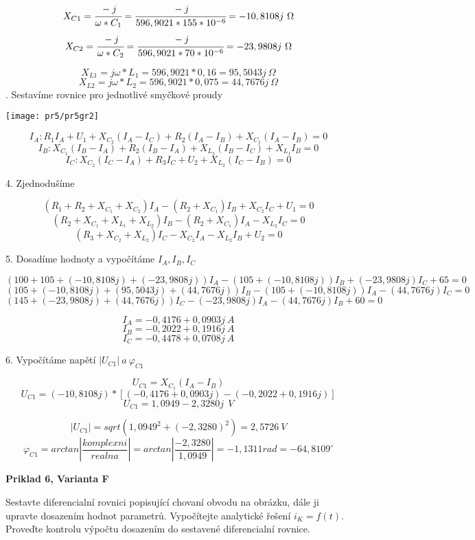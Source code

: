\documentclass[a4paper,12pt]{article}
\begin{document}
$$
 X_{C1} = \cfrac{-j}{\omega * C_1} = \cfrac{-j}{596,9021 * 155 * 10^{-6}} = -10,8108j\ \Omega 
$$
$$
 X_{C2} = \cfrac{-j}{\omega * C_2} = \cfrac{-j}{596,9021 * 70 * 10^{-6}} = -23,9808j\ \Omega
$$

$$
X_{L1} = j\omega * L_1 = 596,9021 * 0,16  = 95,5043j\ \Omega 
$$
$$
X_{L2} = j\omega * L_2 = 596,9021 * 0,075  = 44,7676j\ \Omega
$$
. Sestavíme rovnice pro jednotlivé smyčkové proudy

\begin{center}
\texttt{[image: pr5/pr5gr2]}
\end{center}

$$I_{A}: R_{1}I_{A} + U_{1} + X_{C_{2}}(I_{A}-I_{C}) + R_{2}(I_{A}-I_{B})+X_{C_{1}}(I_{A}-I_{B})=0$$
$$I_{B}: X_{C_{1}}(I_{B}-I_{A}) + R_{2}(I_{B}-I_{A}) + X_{L_{2}}(I_{B}-I_{C}) + X_{L_{1}}I_{B}=0$$
$$I_{C}: X_{C_{2}}(I_{C}-I_{A}) + R_{3}I_{C} + U_{2} + X_{L_{2}}(I_{C}-I_{B})=0$$

4. Zjednodušíme

$$(R_{1}+R_{2}+X_{C_{1}}+X_{C_{2}})I_{A} - (R_{2}+X_{C_{1}})I_{B} + X_{C_{2}}I_{C} + U_{1}=0$$
$$(R_{2}+X_{C_{1}}+X_{L_{1}}+X_{L_{2}})I_{B} - (R_{2}+X_{C_{1}})I_{A} - X_{L_{2}}I_{C}=0$$
$$(R_{3}+X_{C_{2}}+X_{L_{2}})I_{C} - X_{C_{2}}I_{A} - X_{L_{2}}I_{B} + U_{2}=0$$

5. Dosadíme hodnoty a vypočítáme $I_{A}, I_{B}, I_{C}$ 

$$(100+105+(-10,8108j)+(-23,9808j))I_{A} - (105+(-10,8108j))I_{B} + (-23,9808j)I_{C} + 65=0$$
$$(105+(-10,8108j)+(95,5043j)+(44,7676j))I_{B} - (105+(-10,8108j))I_{A} - (44,7676j)I_{C}=0$$
$$(145+(-23,9808j)+(44,7676j))I_{C} - (-23,9808j)I_{A} - (44,7676j)I_{B} + 60=0$$

$$I_{A} = -0,4176 + 0,0903j\ A$$
$$I_{B} = -0,2022 + 0,1916j\ A$$
$$I_{C} = -0,4478 + 0,0708j\ A$$

6. Vypočítáme napětí $|U_{C1}|\ a\ \varphi_{C1}$

$$U_{C1} = X_{C_{1}}(I_{A} - I_{B})$$
$$U_{C1} = (-10,8108j) * [(-0,4176 + 0,0903j) - (-0,2022 + 0,1916j)]$$
$$U_{C1} = 1,0949 - 2,3280j\ \ V$$

$$|U_{C1}| = sqrt(1,0949^2 + (- 2,3280)^2) = 2,5726\ V$$
$$\varphi_{C1} = arctan \left|\frac{komplexni}{realna}\right| = arctan \left|\frac{- 2,3280}{1,0949}\right| = -1,1311 rad = -64,8109^\circ$$

\newpage
\newpage
\begin{center}
\textbf{Priklad 6, Varianta F}
\end{center}
\bigskip
Sestavte diferencialní rovnici popisující chovaní obvodu na obrázku, dále ji upravte dosazením hodnot parametrů. Vypočítejte analytické řešení $i_K = f(t)$. Proveďte kontrolu výpočtu dosazením do sestavené diferencialní rovnice.
\bigskip
\end{document}
